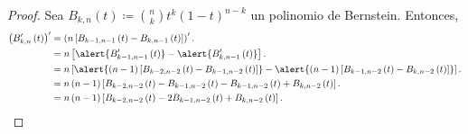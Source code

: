 \begin{frame}
    \begin{proof}
        Sea
        \begin{math}
            B_{k,n}\left(t\right)\coloneqq
            \binom{n}{k}
            t^{k}
            \left(1-t\right)^{n-k}
        \end{math}
        un polinomio de Bernstein.
        Entonces,
        \begin{align*}
            {\left(
                B^{\prime}_{k,n}\left(t\right)
                \right)}^{\prime}
             & =
            \left(
            n
            \left[
                B_{k-1,n-1}\left(t\right)-
                B_{k,n-1}\left(t\right)
                \right]
            \right)^{\prime}. \\
             & =
            n\left[
                \alert{
                    B^{\prime}_{k-1,n-1}\left(t\right)
                }    -
                \alert{
                    B^{\prime}_{k,n-1}\left(t\right)
                }
            \right].          \\
             & =
            n\left[
                \alert{
                    \left(n-1\right)
                    \left[
                        B_{k-2,n-2}\left(t\right)-
                        B_{k-1,n-2}\left(t\right)
                        \right]
                }    -
                \alert{
                    \left(n-1\right)
                    \left[
                        B_{k-1,n-2}\left(t\right)-
                        B_{k,n-2}\left(t\right)
                        \right]
                }
            \right].          \\
             & =
            n\left(n-1\right)
            \left[
                B_{k-2,n-2}\left(t\right)-
                B_{k-1,n-2}\left(t\right)-
                B_{k-1,n-2}\left(t\right)+
                B_{k,n-2}\left(t\right)
            \right].          \\
             & =
            n\left(n-1\right)
            \left[
                B_{k-2,n-2}\left(t\right)-
                2B_{k-1,n-2}\left(t\right)+
                B_{k,n-2}\left(t\right)
                \right].
        \end{align*}
    \end{proof}
\end{frame}